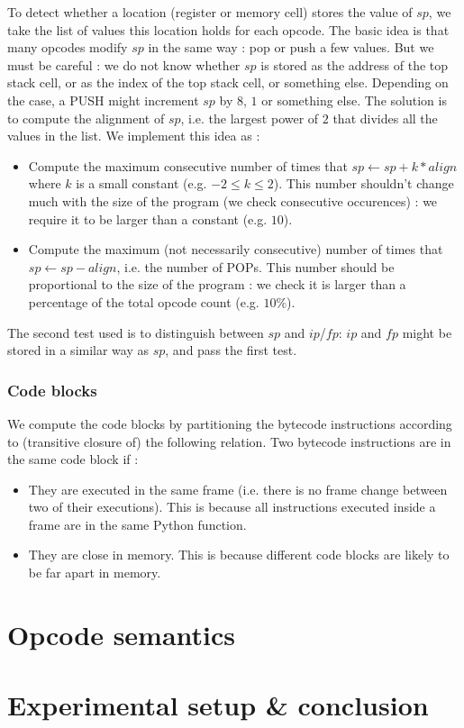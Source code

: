 \documentclass[french]{article}
\begin{document}
To detect whether a location (register or memory cell) stores the value of $sp$, we take the list of values this location holds for each opcode. The basic idea is that many opcodes modify $sp$ in the same way : pop or push a few values. But we must be careful : we do not know whether $sp$ is stored as the address of the top stack cell, or as the index of the top stack cell, or something else. Depending on the case, a PUSH might increment $sp$ by $8$, $1$ or something else. The solution is to compute the alignment of $sp$, i.e. the largest power of $2$ that divides all the values in the list. We implement this idea as :
\begin{itemize}
	\item Compute the maximum consecutive number of times that $sp \leftarrow sp + k*align$ where $k$ is a small constant (e.g. $-2 \leq k \leq 2$). This number shouldn't change much with the size of the program (we check consecutive occurences) : we require it to be larger than a constant (e.g. $10$).
	\item Compute the maximum (not necessarily consecutive) number of times that $sp \leftarrow sp - align$, i.e. the number of POPs. This number should be proportional to the size of the program : we check it is larger than a percentage of the total opcode count (e.g. $10\%$).
\end{itemize}
The second test used is to distinguish between $sp$ and $ip$/$fp$: $ip$ and $fp$ might be stored in a similar way as $sp$, and pass the first test. 

\subsubsection{Code blocks}

We compute the code blocks by partitioning the bytecode instructions according to (transitive closure of) the following relation. Two bytecode instructions are in the same code block if :
\begin{itemize}
	\item They are executed in the same frame (i.e. there is no frame change between two of their executions). This is because all instructions executed inside a frame are in the same Python function.
	\item They are close in memory. This is because different code blocks are likely to be far apart in memory. %
\end{itemize}


\section{Opcode semantics}


\section{Experimental setup \& conclusion}
\end{document}
